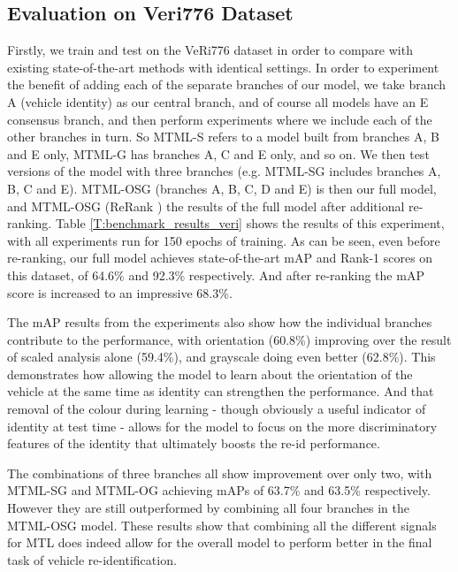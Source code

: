 \documentclass[10pt,twocolumn,letterpaper]{article}
\begin{document}
\subsection{Evaluation on Veri776 Dataset}
Firstly, we train and test on the VeRi776 dataset in order to compare with
existing state-of-the-art methods with identical settings. In order to experiment the benefit of adding each of the separate branches of our model, we take branch A (vehicle identity) as our central branch, and of course all models have an E consensus branch, and then perform experiments where we include each of the other branches in turn. So MTML-S refers to a model built from branches A, B and E only, MTML-G has branches A, C and E only, and so on. We then test versions of the model with three branches (e.g. MTML-SG includes branches A, B, C and E).  
MTML-OSG (branches A, B, C, D and E) is then our full model, and MTML-OSG (ReRank \cite{zhong2017re}) the results of the full model after additional re-ranking. Table \ref{T:benchmark_results_veri} shows the results of this
experiment, with all experiments run for 150 epochs of training. As can be seen,
even before re-ranking, our full model achieves state-of-the-art mAP
and Rank-1 scores on this dataset, of 64.6\% and 92.3\%
respectively. And after re-ranking the mAP score is increased to an
impressive 68.3\%.

The mAP results from the experiments also show how the individual branches contribute to the performance, with orientation (60.8\%) improving over the result of scaled analysis alone (59.4\%), and grayscale doing even better (62.8\%). This demonstrates how allowing the model to learn about the orientation of the vehicle at the same time as identity can strengthen the performance. And that removal of the colour during learning - though obviously a useful indicator of identity at test time - allows for the model to focus on the more discriminatory features of the identity that ultimately boosts the re-id performance.

The combinations of three branches all show improvement over only two, with MTML-SG and MTML-OG achieving mAPs of 63.7\% and 63.5\% respectively. However they are still outperformed by combining all four branches in the MTML-OSG model. These results show that combining all the different signals for MTL does indeed allow for the overall model to perform better in the final task of vehicle re-identification.

\end{document}
